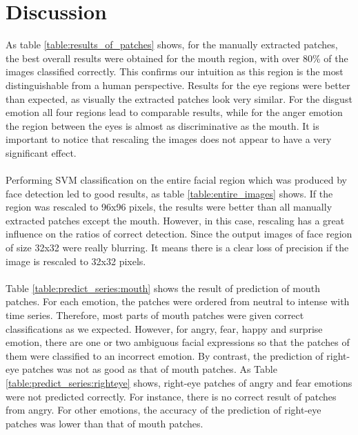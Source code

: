 \section{Discussion}
As table \ref{table:results_of_patches} shows, for the manually extracted patches, the best overall results were obtained for the mouth region, with over 80\% of the images classified correctly.
This confirms our intuition as this region is the most distinguishable
from a human perspective. Results for the eye regions were better than expected, as visually the extracted patches look very similar. For the disgust emotion all
four regions lead to comparable results, while for the anger emotion the region between the eyes is almost as discriminative as the mouth. It is important to notice that rescaling the images does not appear to have a very significant effect.
\\
\\
Performing SVM classification on the entire facial region which was produced by face detection led to good results, as table \ref{table:entire_images} shows. If the region was rescaled to 96x96 pixels, the results were better than all manually extracted
patches except the mouth. However, in this case, rescaling has a great influence on the ratios of correct detection. Since the output images of face region of size 32x32 were really blurring. It means there is a clear loss of precision if the image is rescaled to 32x32 pixels. %
\\
\\
Table \ref{table:predict_series:mouth} shows the result of prediction of mouth patches. For each emotion, the patches were ordered from neutral to intense with time series. Therefore, most parts of mouth patches were given correct classifications as we expected. However, for angry, fear, happy and surprise emotion, there are one or two ambiguous facial expressions so that the patches of them were classified to an incorrect emotion. By contrast, the prediction of right-eye patches was not as good as that of mouth patches. As Table \ref{table:predict_series:righteye} shows, right-eye patches of angry and fear emotions were not predicted correctly. For instance, there is no correct result of patches from angry. For other emotions, the accuracy of the prediction of right-eye patches was lower than that of mouth patches.
\\
